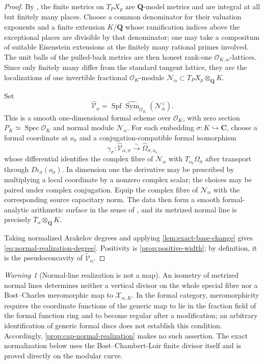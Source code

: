 \documentclass[11pt]{article}
\theoremstyle{definition}
\theoremstyle{remark}
\newtheorem{warning}[warning]{Warning}
\newcommand{\Q}{\mathbf Q}
\newcommand{\C}{\mathbf C}
\begin{document}
\begin{proof}
By \cite[Propositions~5.1 and~5.17]{BostChambertLoir2009}, the finite metrics
on $T_PX_p$ are $\Q$-model metrics and are integral at all but finitely many
places.  Choose a common denominator for their valuation exponents and a
finite extension $K/\Q$ whose ramification indices above the exceptional
places are divisible by that denominator; one may take a compositum of
suitable Eisenstein extensions at the finitely many rational primes involved.
The unit balls of the pulled-back
metrics are then honest rank-one $\mathcal O_{K,w}$-lattices.  Since only
finitely many differ from the standard tangent lattice, they are the
localizations of one invertible fractional $\mathcal O_K$-module
$\mathcal N_\alpha\subset T_PX_p\otimes_\Q K$.

Set
\[
 \widehat{\mathscr V}_\alpha
 =\operatorname{Spf}
   \widehat{\operatorname{Sym}}_{\mathcal O_K}
   (\mathcal N_\alpha^\vee).
\]
This is a smooth one-dimensional formal scheme over $\mathcal O_K$, with
zero section $P_K\simeq\operatorname{Spec}\mathcal O_K$ and normal module
$\mathcal N_\alpha$.  For each embedding $\sigma:K\hookrightarrow\C$, choose
a formal coordinate at $o_\sigma$ and a conjugation-compatible formal
isomorphism
\[
 \gamma_\sigma:
 \widehat{\mathscr V}_{\alpha,\sigma}
 \xrightarrow{\sim}\widehat{\Omega}_{\sigma,o_\sigma}
\]
whose differential identifies the complex fibre of $\mathcal N_\alpha$ with
$T_{o_\sigma}\Omega_\sigma$ after transport through
$D\iota_\sigma(o_\sigma)$.  In dimension one the derivative may be prescribed
by multiplying a local coordinate by a nonzero complex scalar; the choices
may be paired under complex conjugation.  Equip the complex fibre of
$\mathcal N_\alpha$ with the corresponding source capacitary norm.  The data
then form a smooth formal-analytic arithmetic surface in the sense of
\cite[Sections~6.1--6.2]{BostCharles2022}, and its metrized normal line is
precisely $\overline T_\alpha\otimes_\Q K$.

Taking normalized Arakelov degrees and applying
\cref{lem:exact-base-change} gives
\eqref{eq:normal-realization-degree}.  Positivity is
\cref{prop:positive-width}; by definition, it is the pseudoconcavity of
$\widetilde{\mathscr V}_\alpha$.
\end{proof}

\begin{warning}[Normal-line realization is not a map]
\label{warn:normal-line-only}
An isometry of metrized normal lines determines neither a vertical divisor on
the whole special fibre nor a Bost--Charles meromorphic map to
$\mathscr X_{\alpha,K}$.  In the formal category, meromorphicity requires the
coordinate functions of the generic map to lie in the fraction field of the
formal function ring and to become regular after a modification; an arbitrary
identification of generic formal discs does not establish this condition.
Accordingly, \cref{prop:cap-normal-realization} makes no such assertion.  The
exact normalization below uses the Bost--Chambert-Loir finite divisor itself
and is proved directly on the modular curve.
\end{warning}
\end{document}

